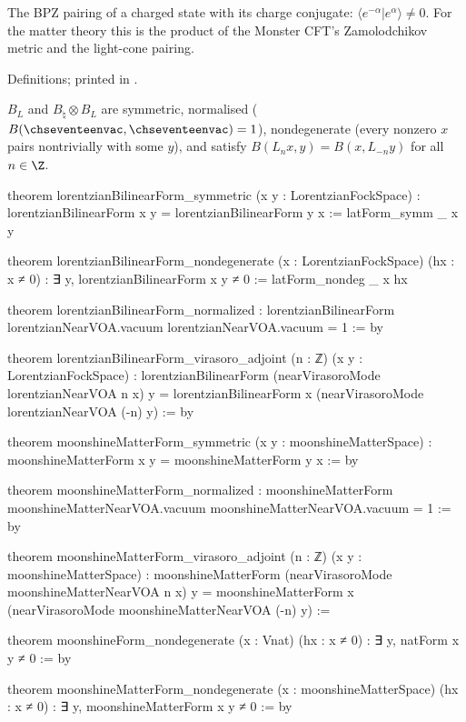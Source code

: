 \begin{physics}
The BPZ pairing of a charged state with its charge conjugate: $\langle e^{-\alpha}|e^\alpha\rangle\neq0$.  For the matter theory
this is the product of the Monster CFT's Zamolodchikov metric and the light-cone pairing.
\end{physics}

\begin{status}
Definitions; printed in .
\end{status}

\begin{theorem}\label{ch17:thm:matterform}
$B_L$ and $B_\natural\otimes B_L$ are symmetric, normalised ($B(\chseventeenvac,\chseventeenvac)=1$), nondegenerate (every nonzero $x$ pairs
nontrivially with some $y$), and satisfy $B(L_nx,y)=B(x,L_{-n}y)$ for all $n\in\Z$.
\end{theorem}

\begin{leancode}
theorem lorentzianBilinearForm_symmetric (x y : LorentzianFockSpace) :
    lorentzianBilinearForm x y = lorentzianBilinearForm y x := latForm_symm _ x y

theorem lorentzianBilinearForm_nondegenerate (x : LorentzianFockSpace) (hx : x ≠ 0) :
    ∃ y, lorentzianBilinearForm x y ≠ 0 := latForm_nondeg _ x hx

theorem lorentzianBilinearForm_normalized :
    lorentzianBilinearForm lorentzianNearVOA.vacuum lorentzianNearVOA.vacuum = 1 := by

theorem lorentzianBilinearForm_virasoro_adjoint (n : ℤ) (x y : LorentzianFockSpace) :
    lorentzianBilinearForm (nearVirasoroMode lorentzianNearVOA n x) y =
      lorentzianBilinearForm x (nearVirasoroMode lorentzianNearVOA (-n) y) := by

theorem moonshineMatterForm_symmetric (x y : moonshineMatterSpace) :
    moonshineMatterForm x y = moonshineMatterForm y x := by

theorem moonshineMatterForm_normalized :
    moonshineMatterForm moonshineMatterNearVOA.vacuum moonshineMatterNearVOA.vacuum = 1 := by

theorem moonshineMatterForm_virasoro_adjoint (n : ℤ) (x y : moonshineMatterSpace) :
    moonshineMatterForm (nearVirasoroMode moonshineMatterNearVOA n x) y =
      moonshineMatterForm x (nearVirasoroMode moonshineMatterNearVOA (-n) y) :=

theorem moonshineForm_nondegenerate (x : Vnat) (hx : x ≠ 0) : ∃ y, natForm x y ≠ 0 := by

theorem moonshineMatterForm_nondegenerate (x : moonshineMatterSpace) (hx : x ≠ 0) :
    ∃ y, moonshineMatterForm x y ≠ 0 := by
\end{leancode}

